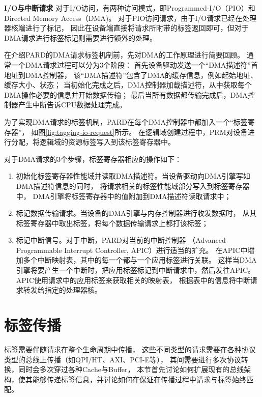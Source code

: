 \textbf{I/O与中断请求}\quad
对于I/O访问，有两种访问模式，即Programmed-I/O（PIO）和Directed Memory Access（DMA)。
对于PIO访问请求，由于I/O请求已经在处理器核端进行了标记，
因此在设备端直接将请求所附带的标签返回即可，但对于DMA请求进行标签标记则需要进行额外的处理。

在介绍PARD的DMA请求标签机制前，先对DMA的工作原理进行简要回顾。
通常一个DMA请求过程可以分为3个阶段：
首先设备驱动发送一个``DMA描述符''首地址到DMA控制器，
该``DMA描述符''包含了DMA的缓存信息，例如起始地址、缓存大小、状态；
当初始化完成之后，DMA控制器加载描述符，从中获取每个DMA操作必要的信息并开始数据传输；
最后当所有数据都传输完成后，DMA控制器产生中断告诉CPU数据处理完成。

为了实现DMA请求的标签机制，PARD在每个DMA控制器中都加入一个``标签寄存器''，
如图\ref{fig:tagging-io-request}所示。
在逻辑域创建过程中，PRM对设备进行分配，将逻辑域的资源标签写入到该标签寄存器中。

对于DMA请求的3个步骤，标签寄存器相应的操作如下：

\begin{enumerate}[leftmargin=2\parindent, nolistsep, label=\arabic*）]
  \item 初始化标签寄存器性能域并读取DMA描述符。当设备驱动向DMA引擎写如DMA描述符信息的同时，
        将请求相关的标签性能域部分写入到标签寄存器中，
        DMA引擎将标签寄存器中的值附加到DMA描述符读取请求中；
  \item 标记数据传输请求。当设备的DMA引擎与内存控制器进行收发数据时，
        从其标签寄存器中取出标签，将每个数据传输请求上都打该标签；
  \item 标记中断信号。对于中断，PARD对当前的中断控制器
        （Advanced Programmable Interrupt Controller, APIC）进行适当的扩充。
        在APIC中增加多个中断映射表，其中的每一个都与一个应用标签进行关联。
        这样当DMA引擎将要产生一个中断时，把应用标签标记到中断请求中，然后发往APIC。
        APIC使用请求中的应用标签来获取相关的映射表，
        根据表中的信息将中断请求转发给指定的处理器核。
\end{enumerate}



\section{标签传播}
\label{chap:labeladdrspace:propagation}

标签需要伴随请求在整个生命周期中传播，
这些不同类型的请求需要在各种协议类型的总线上传播（如QPI/HT、AXI、PCI-E等），
其间需要进行多次协议转换，同时会多次穿过各种Cache与Buffer，
本节首先讨论如何扩展现有的总线架构，使其能够传递标签信息，并讨论如何在保证在传播过程中请求与标签始终匹配。

